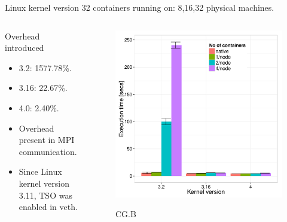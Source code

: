 \documentclass[presentation]{beamer}
\begin{document}
\begin{frame}[label=sec-3-3]{Linux kernel version}
32 containers running on: 8,16,32 physical machines.

\begin{columns}
\begin{column}{0.5\textwidth}
\begin{block}{Overhead introduced}


\begin{itemize}
\item 3.2: \alert{1577.78\%}.
\item 3.16: \alert{22.67\%}.
\item 4.0: \alert{2.40\%}.
\item Overhead present in MPI communication.
\item Since Linux kernel version \alert{3.11}, \alert{TSO} was enabled in \alert{veth}.
\end{itemize}
\end{block}
\end{column}
\begin{column}{0.5\textwidth}





\begin{figure}[!h]
  \center
  \includegraphics[scale=0.32]{figures/execution_time-kernel-cgB.pdf}
  \label{fig:hpc}
  \caption{CG.B}
\end{figure}
\end{column}
\end{columns}
\end{frame}
\end{document}
